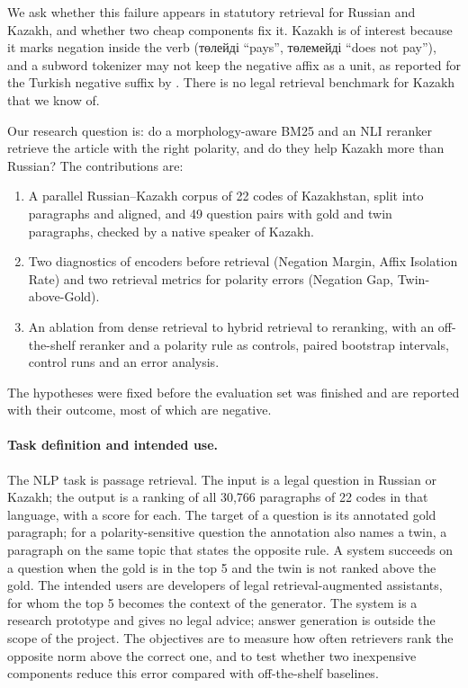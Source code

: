 \documentclass[11pt]{article}
\newcommand{\ru}[1]{#1}
\begin{document}
We ask whether this failure appears in statutory retrieval for Russian and Kazakh, and whether two cheap
components fix it. Kazakh is of interest because it marks negation inside the verb (\ru{төлейді} ``pays'',
\ru{төлемейді} ``does not pay''), and a subword tokenizer may not keep the negative affix as a unit, as
reported for the Turkish negative suffix by \citet{toraman2023tokenization}. There is no legal retrieval
benchmark for Kazakh that we know of.

Our research question is: do a morphology-aware BM25 and an NLI reranker retrieve the article with the right
polarity, and do they help Kazakh more than Russian? The contributions are:

\begin{enumerate}
\item A parallel Russian--Kazakh corpus of 22 codes of Kazakhstan, split into paragraphs and aligned, and 49
question pairs with gold and twin paragraphs, checked by a native speaker of Kazakh.
\item Two diagnostics of encoders before retrieval (Negation Margin, Affix Isolation Rate) and two
retrieval metrics for polarity errors (Negation Gap, Twin-above-Gold).
\item An ablation from dense retrieval to hybrid retrieval to reranking, with an off-the-shelf reranker and a
polarity rule as controls, paired bootstrap intervals, control runs and an error analysis.
\end{enumerate}

The hypotheses were fixed before the evaluation set was finished and are reported with their outcome, most
of which are negative.

\paragraph{Task definition and intended use.} The NLP task is passage retrieval. The input is a legal question in
Russian or Kazakh; the output is a ranking of all 30,766 paragraphs of 22 codes in that language, with a score
for each. The target of a question is its annotated gold paragraph; for a polarity-sensitive question the
annotation also names a twin, a paragraph on the same topic that states the opposite rule. A system succeeds on a
question when the gold is in the top 5 and the twin is not ranked above the gold. The intended users are
developers of legal retrieval-augmented assistants, for whom the top 5 becomes the context of the generator. The
system is a research prototype and gives no legal advice; answer generation is outside the scope of the project.
The objectives are to measure how often retrievers rank the opposite norm above the correct one, and to test
whether two inexpensive components reduce this error compared with off-the-shelf baselines.
\end{document}

